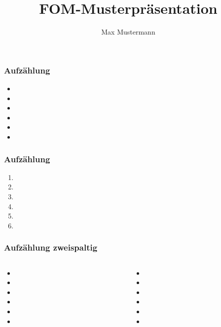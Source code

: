 \documentclass[12pt,ngerman]{beamer}
\author{Max Mustermann}
\title{FOM-Musterpräsentation}
\institute{FOM Hochschule für Oekonomie \& Management}
\begin{document}
\begin{frame}

\maketitle

\end{frame}

\begin{frame}
\frametitle{Aufzählung}

\begin{itemize}
\item 
\item 
\item 
\item 
\item 
\item 
\end{itemize}

\end{frame}


\begin{frame}
\frametitle{Aufzählung}

\begin{enumerate}
\item 
\item 
\item 
\item 
\item 
\item 
\end{enumerate}

\end{frame}

\begin{frame}
\frametitle{Aufzählung zweispaltig}

\begin{columns}
\begin{column}{0.5\textwidth}
\begin{itemize}
\item 
\item 
\item 
\item 
\item 
\item 
\end{itemize}
\end{column}
\begin{column}{0.5\textwidth}
\begin{itemize}
\item 
\item 
\item 
\item 
\item 
\item 
\end{itemize}
\end{column}
\end{columns}

\end{frame}
\end{document}
